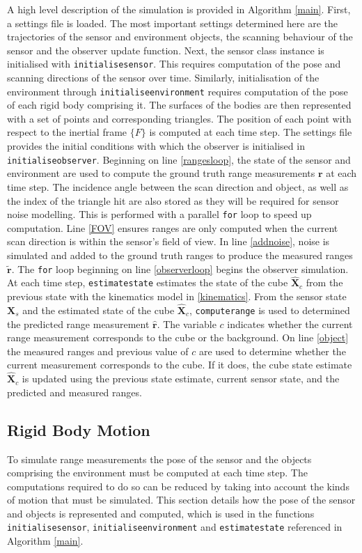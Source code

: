 A high level description of the simulation is provided in Algorithm \ref{main}.
First, a settings file is loaded. The most important settings determined here are the trajectories of the sensor and environment objects, the scanning behaviour of the sensor and the observer update function.
Next, the sensor class instance is initialised with \texttt{initialisesensor}. This requires computation of the pose and scanning directions of the sensor over time. Similarly, initialisation of the environment through \texttt{initialiseenvironment} requires computation of the pose of each rigid body comprising it. The surfaces of the bodies are then represented with a set of points and corresponding triangles. The position of each point with respect to the inertial frame $\{F\}$ is computed at each time step. The settings file provides the initial conditions with which the observer is initialised in \texttt{initialiseobserver}. 
Beginning on line \ref{rangesloop}, the state of the sensor and environment are used to compute the ground truth range measurements $\mathbf{r}$ at each time step. The incidence angle between the scan direction and object, as well as the index of the triangle hit are also stored as they will be required for sensor noise modelling. This is performed with a parallel \texttt{for} loop to speed up computation. Line \ref{FOV} ensures ranges are only computed when the current scan direction is within the sensor's field of view.
In line \ref{addnoise}, noise is simulated and added to the ground truth ranges to produce the measured ranges $\tilde{\mathbf{r}}$.
The \texttt{for} loop beginning on line \ref{observerloop} begins the observer simulation. 
At each time step, \texttt{estimatestate} estimates the state of the cube $\hat{\mathbf{X}}_c$ from the previous state with the kinematics model in \ref{kinematics}.
From the sensor state $\mathbf{X}_s$ and the estimated state of the cube $\hat{\mathbf{X}}_c$, \texttt{computerange} is used to determined the predicted range measurement $\hat{\mathbf{r}}$.
The variable $c$ indicates whether the current range measurement corresponds to the cube or the background. On line \ref{object} the measured ranges and previous value of $c$ are used to determine whether the current measurement corresponds to the cube. If it does, the cube state estimate $\hat{\mathbf{X}}_c$ is updated using the previous state estimate, current sensor state, and the predicted and measured ranges.


\subsection{Rigid Body Motion} \label{motion}
To simulate range measurements the pose of the sensor and the objects comprising the environment must be computed at each time step. The computations required to do so can be reduced by taking into account the kinds of motion that must be simulated. This section details how the pose of the sensor and objects is represented and computed, which is used in the functions \texttt{initialisesensor}, \texttt{initialiseenvironment} and \texttt{estimatestate} referenced in Algorithm \ref{main}.

